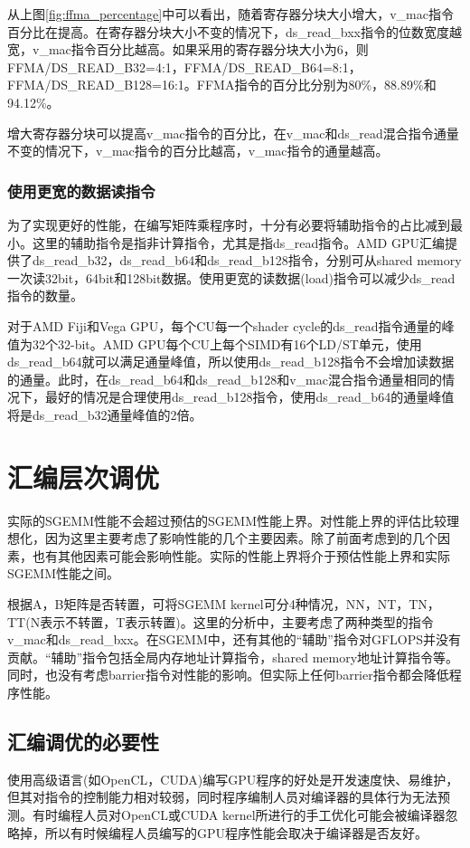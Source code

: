从上图\ref{fig:ffma_percentage}中可以看出，随着寄存器分块大小增大，v\_mac指令百分比在提高。在寄存器分块大小不变的情况下，ds\_read\_bxx指令的位数宽度越宽，v\_mac指令百分比越高。如果采用的寄存器分块大小为6，则FFMA/DS\_READ\_B32=4:1，FFMA/DS\_READ\_B64=8:1，FFMA/DS\_READ\_B128=16:1。FFMA指令的百分比分别为80\%，88.89\%和94.12\%。

增大寄存器分块可以提高v\_mac指令的百分比，在v\_mac和ds\_read混合指令通量不变的情况下，v\_mac指令的百分比越高，v\_mac指令的通量越高。

\subsubsection{使用更宽的数据读指令}
为了实现更好的性能，在编写矩阵乘程序时，十分有必要将辅助指令的占比减到最小。这里的辅助指令是指非计算指令，尤其是指ds\_read指令。AMD GPU汇编提供了ds\_read\_b32，ds\_read\_b64和ds\_read\_b128指令，分别可从shared memory一次读32bit，64bit和128bit数据。使用更宽的读数据(load)指令可以减少ds\_read指令的数量。

对于AMD Fiji和Vega GPU，每个CU每一个shader cycle的ds\_read指令通量的峰值为32个32-bit。AMD GPU每个CU上每个SIMD有16个LD/ST单元，使用ds\_read\_b64就可以满足通量峰值，所以使用ds\_read\_b128指令不会增加读数据的通量。此时，在ds\_read\_b64和ds\_read\_b128和v\_mac混合指令通量相同的情况下，最好的情况是合理使用ds\_read\_b128指令，使用ds\_read\_b64的通量峰值将是ds\_read\_b32通量峰值的2倍。


\section{汇编层次调优}
实际的SGEMM性能不会超过预估的SGEMM性能上界。对性能上界的评估比较理想化，因为这里主要考虑了影响性能的几个主要因素。除了前面考虑到的几个因素，也有其他因素可能会影响性能。实际的性能上界将介于预估性能上界和实际SGEMM性能之间。

根据A，B矩阵是否转置，可将SGEMM kernel可分4种情况，NN，NT，TN，TT(N表示不转置，T表示转置)。这里的分析中，主要考虑了两种类型的指令v\_mac和ds\_read\_bxx。在SGEMM中，还有其他的“辅助”指令对GFLOPS并没有贡献。“辅助”指令包括全局内存地址计算指令，shared memory地址计算指令等。同时，也没有考虑barrier指令对性能的影响。但实际上任何barrier指令都会降低程序性能。

\subsection{汇编调优的必要性}
使用高级语言(如OpenCL，CUDA)编写GPU程序的好处是开发速度快、易维护，但其对指令的控制能力相对较弱，同时程序编制人员对编译器的具体行为无法预测。有时编程人员对OpenCL或CUDA kernel所进行的手工优化可能会被编译器忽略掉，所以有时候编程人员编写的GPU程序性能会取决于编译器是否友好。

